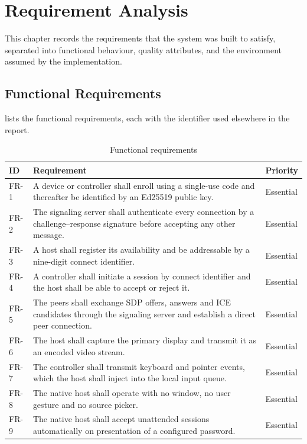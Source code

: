 \chapter{Requirement Analysis}

This chapter records the requirements that the system was built to satisfy,
separated into functional behaviour, quality attributes, and the environment
assumed by the implementation.

\section{Functional Requirements}

 lists the functional requirements, each with the
identifier used elsewhere in the report.

\begin{table}[H]
\centering
\caption{Functional requirements}
\label{tab:funcreq}
\small
\begin{tabular}{@{}p{1.4cm}p{8.4cm}p{2.6cm}@{}}
\toprule
\textbf{ID} & \textbf{Requirement} & \textbf{Priority} \\
\midrule
FR-1 & A device or controller shall enroll using a single-use code and thereafter be identified by an Ed25519 public key. & Essential \\
FR-2 & The signaling server shall authenticate every connection by a challenge--response signature before accepting any other message. & Essential \\
FR-3 & A host shall register its availability and be addressable by a nine-digit connect identifier. & Essential \\
FR-4 & A controller shall initiate a session by connect identifier and the host shall be able to accept or reject it. & Essential \\
FR-5 & The peers shall exchange SDP offers, answers and ICE candidates through the signaling server and establish a direct peer connection. & Essential \\
FR-6 & The host shall capture the primary display and transmit it as an encoded video stream. & Essential \\
FR-7 & The controller shall transmit keyboard and pointer events, which the host shall inject into the local input queue. & Essential \\
FR-8 & The native host shall operate with no window, no user gesture and no source picker. & Essential \\
FR-9 & The native host shall accept unattended sessions automatically on presentation of a configured password. & Essential \\

\end{tabular}
\end{table}
